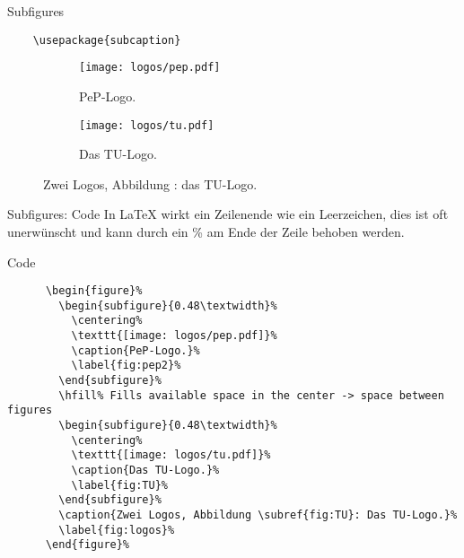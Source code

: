 \begin{frame}[fragile]{
  Subfigures
  \hfill
}
  \begin{Packages}
    \begin{verbatim}
    \usepackage{subcaption}
    \end{verbatim}
  \end{Packages}
  \begin{EmulateArticle}%
    \begin{figure}%
      \begin{subfigure}{0.48\textwidth}%
        \centering%
        \texttt{[image: logos/pep.pdf]}%
        \caption{PeP-Logo.}%
        \label{fig:pep2}%
      \end{subfigure}%
      \hfill%
      \begin{subfigure}{0.48\textwidth}%
        \centering%
        \texttt{[image: logos/tu.pdf]}%
        \caption{Das TU-Logo.}%
        \label{fig:TU}%
      \end{subfigure}%
      \caption{Zwei Logos, Abbildung : das TU-Logo.}\label{fig:logos}%
    \end{figure}%
  \end{EmulateArticle}
\end{frame}

\begin{frame}[fragile]{Subfigures: Code}
  In \LaTeX{} wirkt ein Zeilenende wie ein Leerzeichen,
  dies ist oft unerwünscht und kann durch ein \% am Ende der Zeile behoben werden.

  \begin{block}{Code}
    \begin{verbatim}
      \begin{figure}%
        \begin{subfigure}{0.48\textwidth}%
          \centering%
          \texttt{[image: logos/pep.pdf]}%
          \caption{PeP-Logo.}%
          \label{fig:pep2}%
        \end{subfigure}%
        \hfill% Fills available space in the center -> space between figures
        \begin{subfigure}{0.48\textwidth}%
          \centering%
          \texttt{[image: logos/tu.pdf]}%
          \caption{Das TU-Logo.}%
          \label{fig:TU}%
        \end{subfigure}%
        \caption{Zwei Logos, Abbildung \subref{fig:TU}: Das TU-Logo.}%
        \label{fig:logos}%
      \end{figure}%
    \end{verbatim}
  \end{block}
\end{frame}

